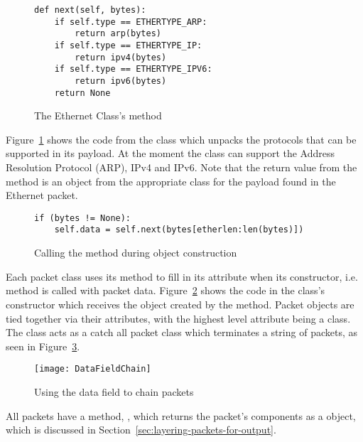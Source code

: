 \documentclass{sig-alternate-10pt}
\begin{document}
\begin{figure}
  \centering
\begin{verbatim}
def next(self, bytes):
    if self.type == ETHERTYPE_ARP:
        return arp(bytes)
    if self.type == ETHERTYPE_IP:
        return ipv4(bytes)
    if self.type == ETHERTYPE_IPV6:
        return ipv6(bytes)
    return None
\end{verbatim}
  \caption{The Ethernet Class's  method}
  \label{fig:ethernet-next-method}
\end{figure}

Figure~\ref{fig:ethernet-next-method} shows the code from the
 class which unpacks the protocols that can be
supported in its payload.  At the moment the  class
can support the Address Resolution Protocol (ARP), IPv4 and IPv6.
Note that the return value from the  method is an object
from the appropriate class for the payload found in the Ethernet packet.

\begin{figure}
  \centering
\begin{verbatim}
if (bytes != None):
    self.data = self.next(bytes[etherlen:len(bytes)])
\end{verbatim}
  \caption{Calling the  method during object construction}
  \label{fig:calling-next-method}
\end{figure}

Each packet class uses its  method to fill in its
 attribute when its constructor,
i.e.  method is called with packet data.
Figure~\ref{fig:calling-next-method} shows the code in the
 class's constructor which receives the object created
by the  method.  Packet objects are tied together via
their  attributes, with the highest level attribute being
a  class.  The  class acts as a catch
all packet class which terminates a string of packets, as seen in
Figure~\ref{fig:data-field-chain}.

\begin{figure}
  \centering
\label{fig:data-field-chain}
\texttt{[image: DataFieldChain]}
  \caption{Using the data field to chain packets}
\end{figure}

All packets have a method, , which returns the packet's
components as a  object, which is discussed in
Section~\ref{sec:layering-packets-for-output}.
\end{document}
